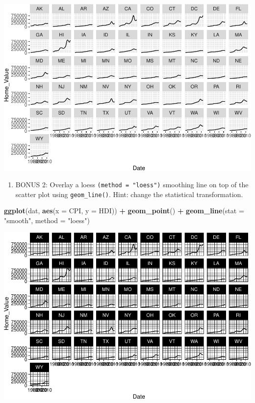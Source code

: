 \documentclass[
]{book}
\newenvironment{Shaded}{\begin{snugshade}}{\end{snugshade}}
\newcommand{\DataTypeTok}[1]{\textcolor[rgb]{0.13,0.29,0.53}{#1}}
\newcommand{\KeywordTok}[1]{\textcolor[rgb]{0.13,0.29,0.53}{\textbf{#1}}}
\newcommand{\NormalTok}[1]{#1}
\newcommand{\OperatorTok}[1]{\textcolor[rgb]{0.81,0.36,0.00}{\textbf{#1}}}
\newcommand{\StringTok}[1]{\textcolor[rgb]{0.31,0.60,0.02}{#1}}
\providecommand{\tightlist}{%
  \setlength{\itemsep}{0pt}\setlength{\parskip}{0pt}}
\begin{document}
\begin{alert}
\includegraphics{R/Rgraphics/figures/unnamed-chunk-181-1.pdf}

\begin{enumerate}
\def\labelenumi{\arabic{enumi}.}
\setcounter{enumi}{5}
\tightlist
\item
  BONUS 2: Overlay a loess \texttt{(method\ =\ "loess")} smoothing line on top of the scatter plot using \texttt{geom\_line()}. Hint: change the statistical transformation.
\end{enumerate}

\begin{Shaded}
\begin{Highlighting}[]
\KeywordTok{ggplot}\NormalTok{(dat, }\KeywordTok{aes}\NormalTok{(}\DataTypeTok{x =}\NormalTok{ CPI, }\DataTypeTok{y =}\NormalTok{ HDI)) }\OperatorTok{+}
\StringTok{  }\KeywordTok{geom\_point}\NormalTok{() }\OperatorTok{+}
\StringTok{  }\KeywordTok{geom\_line}\NormalTok{(}\DataTypeTok{stat =} \StringTok{"smooth"}\NormalTok{, }\DataTypeTok{method =} \StringTok{"loess"}\NormalTok{)}
\end{Highlighting}
\end{Shaded}

\includegraphics{R/Rgraphics/figures/unnamed-chunk-182-1.pdf}

\end{alert}
\end{document}
